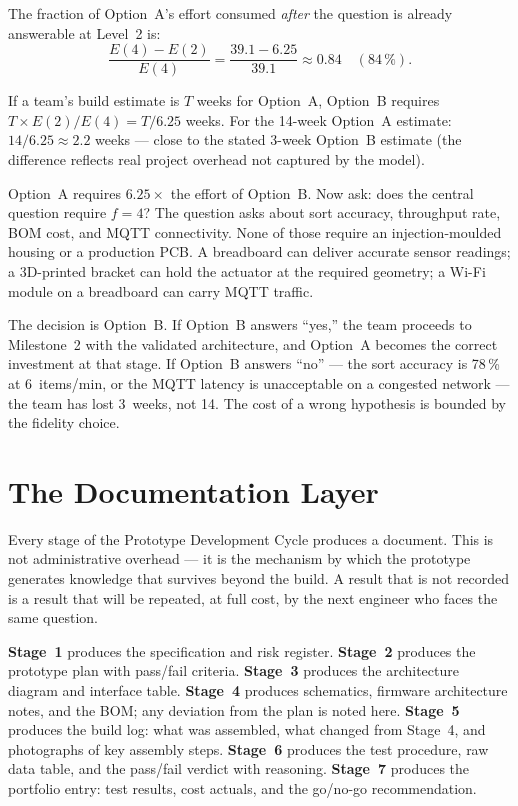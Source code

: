 The fraction of Option~A's effort consumed \emph{after} the question
is already answerable at Level~2 is:
\begin{equation}
  \label{eq:ch3-waste}
  \frac{E(4) - E(2)}{E(4)} = \frac{39.1 - 6.25}{39.1} \approx 0.84
  \quad (84\,\%).
\end{equation}

If a team's build estimate is $T$ weeks for Option~A, Option~B requires
$T \times E(2)/E(4) = T/6.25$ weeks.
For the 14-week Option~A estimate: $14/6.25 \approx 2.2$ weeks --- close
to the stated 3-week Option~B estimate (the difference reflects real
project overhead not captured by the model).

Option~A requires $6.25\times$ the effort of Option~B.
Now ask: does the central question require $f=4$?
The question asks about sort accuracy, throughput rate, BOM cost, and MQTT
connectivity.
None of those require an injection-moulded housing or a production PCB.
A breadboard can deliver accurate sensor readings; a 3D-printed bracket can
hold the actuator at the required geometry; a Wi-Fi module on a breadboard
can carry MQTT traffic.

The decision is Option~B.
If Option~B answers ``yes,'' the team proceeds to Milestone~2 with the
validated architecture, and Option~A becomes the correct investment at that
stage.
If Option~B answers ``no'' --- the sort accuracy is 78\,\% at 6~items/min,
or the MQTT latency is unacceptable on a congested network --- the team has
lost 3~weeks, not 14.
The cost of a wrong hypothesis is bounded by the fidelity choice.

\section{The Documentation Layer}
\label{sec:ch3-documentation}

Every stage of the Prototype Development Cycle produces a document.
This is not administrative overhead --- it is the mechanism by which the
prototype generates knowledge that survives beyond the build.
A result that is not recorded is a result that will be repeated,
at full cost, by the next engineer who faces the same question.

\textbf{Stage~1} produces the specification and risk register.
\textbf{Stage~2} produces the prototype plan with pass/fail criteria.
\textbf{Stage~3} produces the architecture diagram and interface table.
\textbf{Stage~4} produces schematics, firmware architecture notes, and
the BOM; any deviation from the plan is noted here.
\textbf{Stage~5} produces the build log: what was assembled, what
changed from Stage~4, and photographs of key assembly steps.
\textbf{Stage~6} produces the test procedure, raw data table, and the
pass/fail verdict with reasoning.
\textbf{Stage~7} produces the portfolio entry: test results, cost
actuals, and the go/no-go recommendation.

